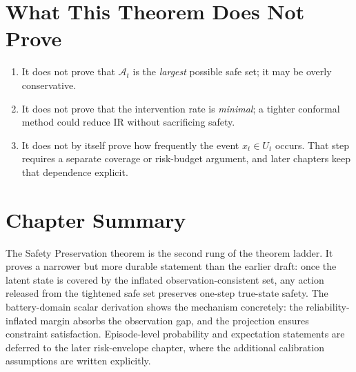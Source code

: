 \section{What This Theorem Does Not Prove}

\begin{enumerate}
  \item It does not prove that $\mathcal{A}_t$ is the \emph{largest}
    possible safe set; it may be overly conservative.
  \item It does not prove that the intervention rate is \emph{minimal};
    a tighter conformal method could reduce IR without sacrificing
    safety.
  \item It does not by itself prove how frequently the event $x_t \in U_t$
    occurs.  That step requires a separate coverage or risk-budget argument,
    and later chapters keep that dependence explicit.
\end{enumerate}

\section{Chapter Summary}

The Safety Preservation theorem is the second rung of the theorem ladder.
It proves a narrower but more durable statement than the earlier draft:
once the latent state is covered by the inflated observation-consistent set,
any action released from the tightened safe set preserves one-step true-state
safety.  The battery-domain scalar derivation shows the mechanism concretely:
the reliability-inflated margin absorbs the observation gap, and the
projection ensures constraint satisfaction.  Episode-level probability and
expectation statements are deferred to the later risk-envelope chapter, where
the additional calibration assumptions are written explicitly.

\begingroup
\def\domainblockid{t2}
\def\domainblocktitle{T2}
\endgroup


